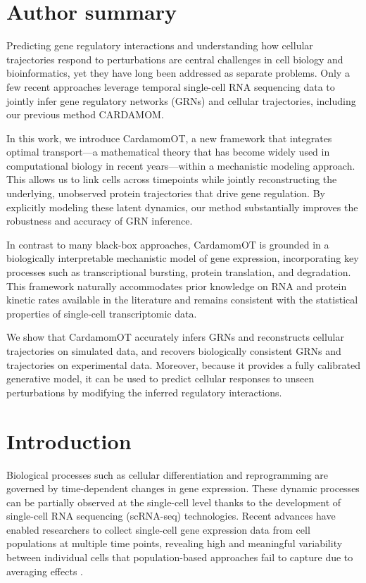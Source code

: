 \documentclass[a4paper, 11pt]{article}
\theoremstyle{plain}
\theoremstyle{remark}
\newcommand*{\firstreview}[1]{{\color{black}#1}}
\begin{document}
\newpage

\section*{Author summary}
Predicting gene regulatory interactions and understanding how cellular trajectories respond to perturbations are central challenges in cell biology and bioinformatics, yet they have long been addressed as separate problems. Only a few recent approaches leverage temporal single-cell RNA sequencing data to jointly infer gene regulatory networks (GRNs) and cellular trajectories, including our previous method CARDAMOM.

In this work, we introduce CardamomOT, a new framework that integrates optimal transport—a mathematical theory that has become widely used in computational biology in recent years—within a mechanistic modeling approach. This allows us to link cells across timepoints while jointly reconstructing the underlying, unobserved protein trajectories that drive gene regulation. By explicitly modeling these latent dynamics, our method substantially improves the robustness and accuracy of GRN inference.

In contrast to many black-box approaches, CardamomOT is grounded in a biologically interpretable mechanistic model of gene expression, incorporating key processes such as transcriptional bursting, protein translation, and degradation. This framework naturally accommodates prior knowledge on RNA and protein kinetic rates available in the literature and remains consistent with the statistical properties of single-cell transcriptomic data.

\firstreview{We show that CardamomOT accurately infers GRNs and reconstructs cellular trajectories on simulated data, and recovers biologically consistent GRNs and trajectories on experimental data.}  Moreover, because it provides a fully calibrated generative model, it can be used to predict cellular responses to unseen perturbations by modifying the inferred regulatory interactions.

\section*{Introduction}

Biological processes such as cellular differentiation and reprogramming are governed by time-dependent changes in gene expression. These dynamic processes can be partially observed at the single-cell level thanks to the development of single-cell RNA sequencing (scRNA-seq) technologies. Recent advances have enabled researchers to collect single-cell gene expression data from cell populations at multiple time points, revealing high and meaningful variability between individual cells \cite{Mojtahedi_2016, Richard_2016, Semrau_2017, Stumpf_2016} that population-based approaches fail to capture due to averaging effects \cite{Mar_2019, Coskun_2016}.
\end{document}
